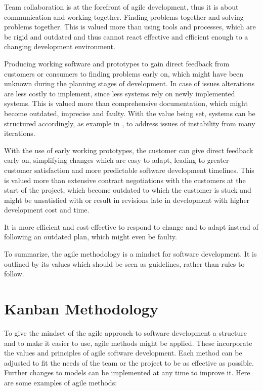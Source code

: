 \documentclass[runningheads]{llncs}
\begin{document}
Team collaboration is at the forefront of agile development, thus it is about communication and working together. 
Finding problems together and solving problems together. This is valued more than using tools and processes, which are be rigid and outdated
and thus cannot react effective and efficient enough to a changing development environment.

Producing working software and prototypes to gain direct feedback from customers or consumers to finding problems early on,
which might have been unknown during the planning stages of development. In case of issues alterations are less costly to implement, 
since less systems rely on newly implemented systems. This is valued more than comprehensive documentation, which might become outdated, 
imprecise and faulty. With the value being set, systems can be structured accordingly, as example in \cite{ref_health}, to address
issues of instability from many iterations.

With the use of early working prototypes, the customer can give direct feedback early on, simplifying changes which are easy to adapt,
leading to greater customer satisfaction and more predictable software development timelines. This is valued more than extensive 
contract negotiations with the customers at the start of the project, which become outdated to which the customer is stuck and might 
be unsatisfied with or result in revisions late in development with higher development cost and time.

It is more efficient and cost-effective to respond to change and to adapt instead of following an outdated plan, which might even be faulty.

To summarize, the agile methodology is a mindset for software development. It is outlined by its values\cite{ref_agilemanifesto}
which should be seen as guidelines, rather than rules to follow.

\section{Kanban Methodology}
To give the mindset of the agile approach to software development a structure and to make it easier to use, agile methods might 
be applied. These incorporate the values and principles of agile software development. Each method can be adjusted to fit the 
needs of the team or the project to be as effective as possible. 
Further changes to models can be implemented at any time to improve it. Here are some examples of agile methods:
\end{document}
